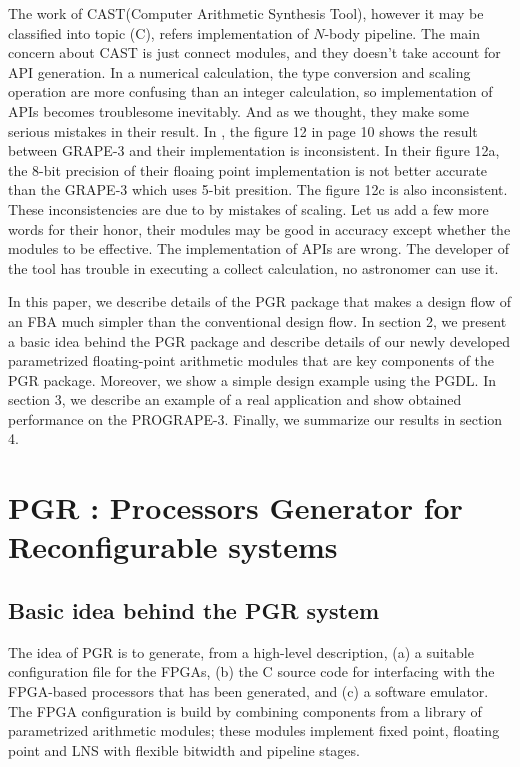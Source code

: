 \documentclass{llncs}
\begin{document}
The work of CAST(Computer Arithmetic Synthesis Tool), however it may
be classified into topic (C), refers implementation of $N$-body
pipeline. The main concern about CAST is just connect modules, and
they doesn't take account for API generation.  In a numerical
calculation, the type conversion and scaling operation are more
confusing than an integer calculation, so implementation of APIs
becomes troublesome inevitably. And as we thought, they make some
serious mistakes in their result\cite{THYL04}.  In \cite{THYL04}, the
figure 12 in page 10 shows the result between GRAPE-3 and their
implementation is inconsistent.  In their figure 12a, the 8-bit
precision of their floaing point implementation is not better accurate
than the GRAPE-3 which uses 5-bit presition. The figure 12c is also
inconsistent. These inconsistencies are due to by mistakes of scaling.
Let us add a few more words for their honor, their modules may be good
in accuracy except whether the modules to be effective.  The
implementation of APIs are wrong.  The developer of the tool has
trouble in executing a collect calculation, no astronomer can use it.





In this paper, we describe details of the PGR package
that makes a design flow of an FBA much simpler than
the conventional design flow.
In section 2, we present a basic idea behind the PGR package
and describe details of our newly developed parametrized 
floating-point arithmetic modules that are key components of the PGR package.
Moreover, we show a simple design example using the PGDL.
In section 3, we describe an example of a real application 
and show obtained performance on the PROGRAPE-3.
Finally, we summarize our results in section 4.
%
\section{PGR : Processors Generator for Reconfigurable systems}
\subsection{Basic idea behind the PGR system}

The idea of PGR is to generate, from a high-level description, (a)
a suitable configuration file for the FPGAs, (b) the C source code for
interfacing with the FPGA-based processors that has been generated,
and (c) a software emulator. The FPGA configuration is build by
combining components from a library of parametrized arithmetic
modules; these modules implement fixed point, floating point and
LNS with flexible bitwidth and pipeline stages.
\end{document}

